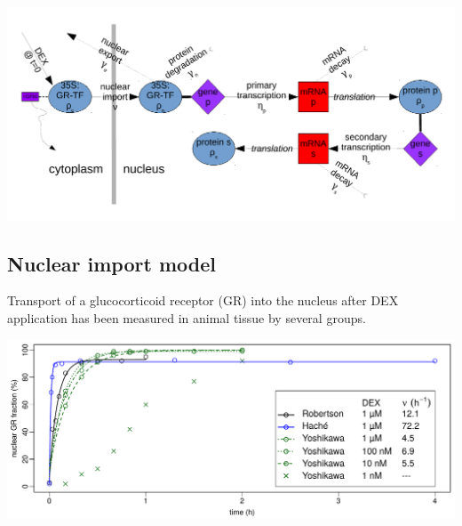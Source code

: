 \documentclass[aspb,landscape]{a0poster}
\newlength{\figwidth}
\begin{document}
\begin{multicols}{4}


  \includegraphics[width=\figwidth]{schematic}

  \subsection*{Nuclear import model}

  Transport of a glucocorticoid receptor (GR) into the nucleus after DEX application has been measured in animal tissue by several groups.

  \begin{minipage}[t]{1.0\linewidth}
    \includegraphics[width=\figwidth]{robertson-hache-yoshikawa}
  \end{minipage}
  

\end{multicols}
\end{document}
